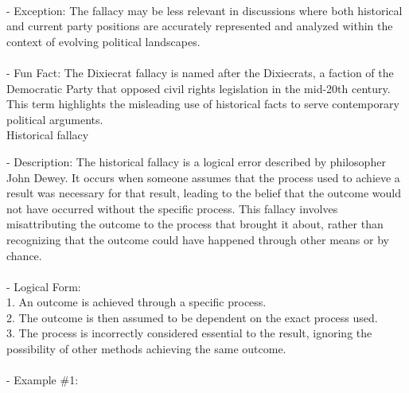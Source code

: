 \documentclass[a4paper,12pt,single,pdftex]{scrbook}
\begin{document}
    
      
    \\

    
      - Exception: The fallacy may be less relevant in discussions where both historical and current party positions are accurately represented and analyzed within the context of evolving political landscapes.
    \\

    
      
    \\

    
      - Fun Fact: The Dixiecrat fallacy is named after the Dixiecrats, a faction of the Democratic Party that opposed civil rights legislation in the mid-20th century. This term highlights the misleading use of historical facts to serve contemporary political arguments.
    \\

  

Historical fallacy
    
      - Description: The historical fallacy is a logical error described by philosopher John Dewey. It occurs when someone assumes that the process used to achieve a result was necessary for that result, leading to the belief that the outcome would not have occurred without the specific process. This fallacy involves misattributing the outcome to the process that brought it about, rather than recognizing that the outcome could have happened through other means or by chance.
    \\

    
      
    \\

    
      - Logical Form:
    \\

    
        1. An outcome is achieved through a specific process.
    \\

    
        2. The outcome is then assumed to be dependent on the exact process used.
    \\

    
        3. The process is incorrectly considered essential to the result, ignoring the possibility of other methods achieving the same outcome.
    \\

    
      
    \\

    
      - Example \#1:
    \\
\end{document}
